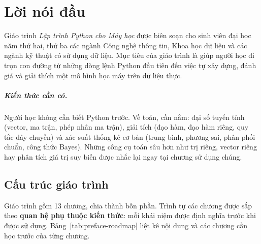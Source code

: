 
\chapter*{Lời nói đầu}

Giáo trình \textit{Lập trình Python cho Máy học} được biên soạn cho sinh viên đại học năm thứ hai, thứ ba các ngành Công nghệ thông tin, Khoa học dữ liệu và các ngành kỹ thuật có sử dụng dữ liệu. Mục tiêu của giáo trình là giúp người học đi trọn con đường từ những dòng lệnh Python đầu tiên đến việc tự xây dựng, đánh giá và giải thích một mô hình học máy trên dữ liệu thực.

\paragraph{Kiến thức cần có.} Người học không cần biết Python trước. Về toán, cần nắm: đại số tuyến tính (vector, ma trận, phép nhân ma trận), giải tích (đạo hàm, đạo hàm riêng, quy tắc dây chuyền) và xác suất thống kê cơ bản (trung bình, phương sai, phân phối chuẩn, công thức Bayes). Những công cụ toán sâu hơn như trị riêng, vector riêng hay phân tích giá trị suy biến được nhắc lại ngay tại chương sử dụng chúng.

\section*{Cấu trúc giáo trình}

Giáo trình gồm 13 chương, chia thành bốn phần. Trình tự các chương được sắp theo \textbf{quan hệ phụ thuộc kiến thức}: mỗi khái niệm được định nghĩa trước khi được sử dụng. Bảng~\ref{tab:preface-roadmap} liệt kê nội dung và các chương cần học trước của từng chương.

